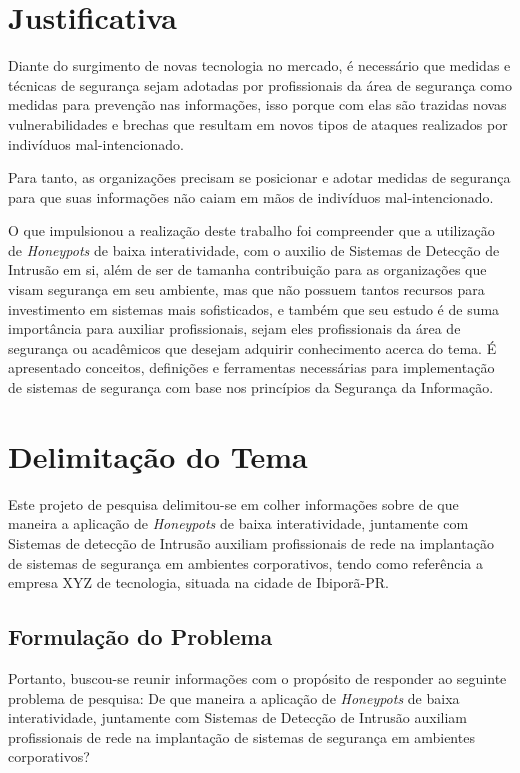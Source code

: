 \section{Justificativa}
Diante do surgimento de novas tecnologia no mercado, é necessário que medidas e técnicas de segurança sejam adotadas por profissionais da área de segurança como medidas para prevenção nas informações, isso porque com elas são trazidas novas vulnerabilidades e brechas que resultam em novos tipos de ataques realizados por indivíduos mal-intencionado.

Para tanto, as organizações precisam se posicionar e adotar medidas de segurança para que suas informações não caiam em mãos de indivíduos mal-intencionado.

O que impulsionou a realização deste trabalho foi compreender que a utilização de \textit{Honeypots} de baixa interatividade, com o auxilio de Sistemas de Detecção de Intrusão em si, além de ser de tamanha contribuição para as organizações que visam segurança em seu ambiente, mas que não possuem tantos recursos para investimento em sistemas mais sofisticados, e também que seu estudo é de suma importância para auxiliar profissionais, sejam eles profissionais da área de segurança ou acadêmicos que desejam adquirir conhecimento acerca do tema. É apresentado conceitos, definições e ferramentas necessárias para implementação de sistemas de segurança com base nos princípios da Segurança da Informação.

\section{Delimitação do Tema}
Este projeto de pesquisa delimitou-se em colher informações sobre de que maneira a aplicação de \textit{Honeypots} de baixa interatividade, juntamente com Sistemas de detecção de Intrusão auxiliam profissionais de rede na implantação de sistemas de segurança em ambientes corporativos, tendo como referência a empresa XYZ de tecnologia, situada na cidade de Ibiporã-PR.

\subsection{Formulação do Problema} %
Portanto, buscou-se reunir informações com o propósito de responder ao seguinte problema de pesquisa: De que maneira a aplicação de \textit{Honeypots} de baixa interatividade, juntamente com Sistemas de Detecção de Intrusão auxiliam profissionais de rede na implantação de sistemas de segurança em ambientes corporativos?


